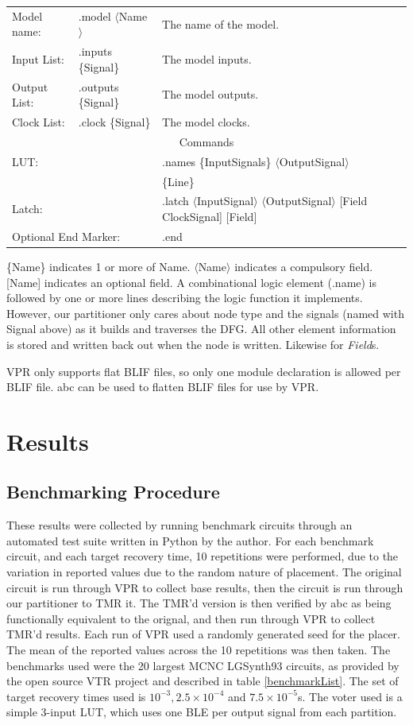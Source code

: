 \documentclass[12pt,final,oneside]{dwThesis} %
\begin{document}
   \begin{tabular}{lll}
      Model name: & .model $\langle$Name$\rangle$ & The name of the model.\\
      Input List: & .inputs \{Signal\} & The model inputs.\\
      Output List:& .outputs \{Signal\} & The model outputs.\\
      Clock List: & .clock \{Signal\} & The model clocks.\\
      \multicolumn{3}{c}{Commands}\\
      \multicolumn{2}{l}{\ac{LUT}:} & .names \{InputSignals\} $\langle$OutputSignal$\rangle$\\
      &&\{Line\}\\
      \multicolumn{2}{l}{Latch:} & .latch $\langle$InputSignal$\rangle$ $\langle$OutputSignal$\rangle$ [Field ClockSignal] [Field]\\
      \multicolumn{2}{l}{Optional End Marker:} & .end
   \end{tabular}

   \{Name\} indicates 1 or more of Name. $\langle$Name$\rangle$ indicates a compulsory field. [Name] indicates an optional field.
   A combinational logic element (.name) is followed by one or more lines describing the logic function it implements. However, our partitioner only cares about node type and the signals (named with Signal above) as it builds and traverses the \ac{DFG}. All other element information is stored and written back out when the node is written. Likewise for \textit{Field}s.

   \ac{VPR} only supports flat \ac{BLIF} files, so only one module declaration is allowed per \ac{BLIF} file. \ac{abc} can be used to flatten \ac{BLIF} files for use by \ac{VPR}.

   \chapter{Results}
   \section{Benchmarking Procedure}
   These results were collected by running benchmark circuits through an automated test suite written in Python by the author. For each benchmark circuit, and each target recovery time, 10 repetitions were performed, due to the variation in reported values due to the random nature of placement.
   The original circuit is run through VPR to collect base results, then the circuit is run through our partitioner to TMR it. The TMR'd version is then verified by abc as being functionally equivalent to the orignal, and then run through VPR to collect TMR'd results. Each run of VPR used a randomly generated seed for the placer.
   The mean of the reported values across the 10 repetitions was then taken.
   The benchmarks used were the 20 largest MCNC LGSynth93 circuits, as provided by the open source VTR project  and described in table \ref{benchmarkList}.
   The set of target recovery times used is $10^{-3}, 2.5\times10^{-4}$ and $7.5\times10^{-5}$s.
   The voter used is a simple 3-input \ac{LUT}, which uses one \ac{BLE} per output signal from each partition.
\end{document}
